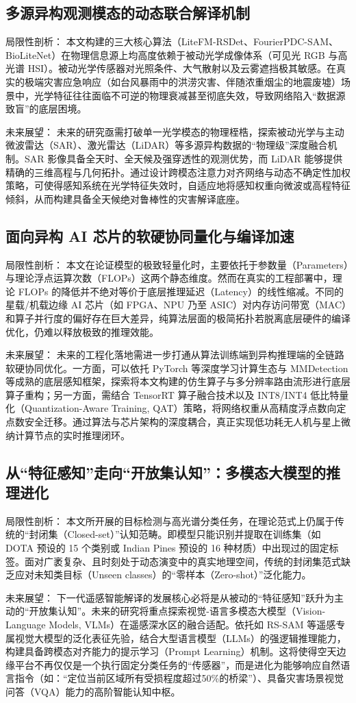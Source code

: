 \subsection{多源异构观测模态的动态联合解译机制}
局限性剖析： 本文构建的三大核心算法（LiteFM-RSDet、FourierPDC-SAM、BioLiteNet）在物理信息源上均高度依赖于被动光学成像体系（可见光 RGB 与高光谱 HSI）。被动光学传感器对光照条件、大气散射以及云雾遮挡极其敏感。在真实的极端灾害应急响应（如台风暴雨中的洪涝灾害、伴随浓重烟尘的地震废墟）场景中，光学特征往往面临不可逆的物理衰减甚至彻底失效，导致网络陷入“数据源致盲”的底层困境。

未来展望： 未来的研究亟需打破单一光学模态的物理桎梏，探索被动光学与主动微波雷达（SAR）、激光雷达（LiDAR）等多源异构数据的“物理级”深度融合机制。SAR 影像具备全天时、全天候及强穿透性的观测优势，而 LiDAR 能够提供精确的三维高程与几何拓扑。通过设计跨模态注意力对齐网络与动态不确定性加权策略，可使得感知系统在光学特征失效时，自适应地将感知权重向微波或高程特征倾斜，从而构建具备全天候绝对鲁棒性的灾害解译底座。

\subsection{面向异构 AI 芯片的软硬协同量化与编译加速}
局限性剖析： 本文在论证模型的极致轻量化时，主要依托于参数量（Parameters）与理论浮点运算次数（FLOPs）这两个静态维度。然而在真实的工程部署中，理论 FLOPs 的降低并不绝对等价于底层推理延迟（Latency）的线性缩减。不同的星载/机载边缘 AI 芯片（如 FPGA、NPU 乃至 ASIC）对内存访问带宽（MAC）和算子并行度的偏好存在巨大差异，纯算法层面的极简拓扑若脱离底层硬件的编译优化，仍难以释放极致的推理效能。

未来展望： 未来的工程化落地需进一步打通从算法训练端到异构推理端的全链路软硬协同优化。一方面，可以依托 PyTorch 等深度学习计算生态与 MMDetection 等成熟的底层感知框架，探索将本文构建的仿生算子与多分辨率路由流形进行底层算子重构；另一方面，需结合 TensorRT 算子融合技术以及 INT8/INT4 低比特量化（Quantization-Aware Training, QAT）策略，将网络权重从高精度浮点数向定点数安全迁移。通过算法与芯片架构的深度耦合，真正实现低功耗无人机与星上微纳计算节点的实时推理闭环。

\subsection{从“特征感知”走向“开放集认知”：多模态大模型的推理进化}
局限性剖析： 本文所开展的目标检测与高光谱分类任务，在理论范式上仍属于传统的“封闭集（Closed-set）”认知范畴。即模型只能识别并提取在训练集（如 DOTA 预设的 15 个类别或 Indian Pines 预设的 16 种材质）中出现过的固定标签。面对广袤复杂、且时刻处于动态演变中的真实地理空间，传统的封闭集范式缺乏应对未知类目标（Unseen classes）的“零样本（Zero-shot）”泛化能力。

未来展望： 下一代遥感智能解译的发展核心必将是从被动的“特征感知”跃升为主动的“开放集认知”。未来的研究将重点探索视觉-语言多模态大模型（Vision-Language Models, VLMs）在遥感深水区的融合适配。依托如 RS-SAM 等遥感专属视觉大模型的泛化表征先验，结合大型语言模型（LLMs）的强逻辑推理能力，构建具备跨模态对齐能力的提示学习（Prompt Learning）机制。这将使得空天边缘平台不再仅仅是一个执行固定分类任务的“传感器”，而是进化为能够响应自然语言指令（如：“定位当前区域所有受损程度超过50\%的桥梁”）、具备灾害场景视觉问答（VQA）能力的高阶智能认知中枢。